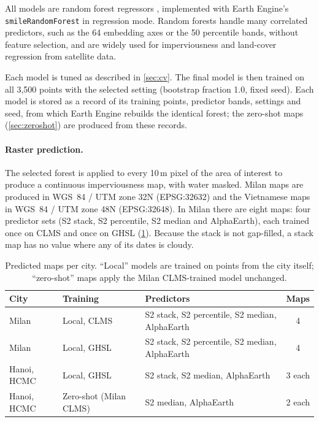 All models are random forest regressors \cite{breiman2001rf}, implemented
with Earth Engine's \texttt{smileRandomForest} in regression mode. Random
forests handle many correlated predictors, such as the 64 embedding axes or
the 50 percentile bands, without feature selection, and are widely used for
imperviousness and land-cover regression from satellite data.

Each model is tuned as described in \cref{sec:cv}. The final model is then
trained on all 3{,}500 points with the selected setting (bootstrap fraction
1.0, fixed seed). Each model is stored as a record of its training points,
predictor bands, settings and seed, from which Earth Engine rebuilds the
identical forest; the zero-shot maps (\cref{sec:zeroshot}) are produced from
these records.

\paragraph{Raster prediction.} The selected forest is applied to every 10\,m
pixel of the area of interest to produce a continuous imperviousness map,
with water masked. Milan maps are produced in WGS~84 / UTM zone 32N
(EPSG:32632) and the Vietnamese maps in WGS~84 / UTM zone 48N (EPSG:32648).
In Milan there are eight maps: four predictor sets (S2 stack, S2 percentile,
S2 median and AlphaEarth), each trained once on CLMS and once on GHSL
(\cref{tab:maps}). Because the stack is not gap-filled, a stack map has no
value where any of its dates is cloudy.

\begin{table}[htbp]
  \centering
  \small
  \caption{Predicted maps per city. ``Local'' models are trained on points
  from the city itself; ``zero-shot'' maps apply the Milan CLMS-trained model
  unchanged.}
  \label{tab:maps}
  \begin{tabular}{lllc}
    \toprule
    City & Training & Predictors & Maps \\
    \midrule
    Milan & Local, CLMS & S2 stack, S2 percentile, S2 median, AlphaEarth & 4 \\
    Milan & Local, GHSL & S2 stack, S2 percentile, S2 median, AlphaEarth & 4 \\
    Hanoi, HCMC & Local, GHSL & S2 stack, S2 median, AlphaEarth & 3 each \\
    Hanoi, HCMC & Zero-shot (Milan CLMS) & S2 median, AlphaEarth & 2 each \\
    \bottomrule
  \end{tabular}
\end{table}

